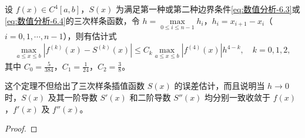 \documentclass[../../main.tex]{subfiles}
\begin{document}
\begin{theorem}\label{theorem:数值分析-定理-5}
设 $f(x)\in C^4[a,b]$，$S(x)$ 为满足第一种或第二种边界条件\eqref{eq:数值分析-6.3}或\eqref{eq:数值分析-6.4}的三次样条函数，令 $h=\max\limits_{0\leqslant i\leqslant n-1} h_i$，$h_i=x_{i+1}-x_i$（$i=0,1,\cdots,n-1$），则有估计式
\begin{align}\label{eq:数值分析-6.17}
\max\limits_{a\leqslant x\leqslant b} | f^{(k)}(x) - S^{(k)}(x) | \leqslant C_k \max\limits_{a\leqslant x\leqslant b} | f^{(4)}(x) | h^{4-k}, \quad k = 0,1,2,
\end{align}
其中 $C_0=\frac{5}{384}$，$C_1=\frac{1}{24}$，$C_2=\frac{3}{8}$。
\end{theorem}
\begin{note}
这个定理不但给出了三次样条插值函数 $S(x)$ 的误差估计，而且说明当 $h\to 0$ 时，$S(x)$ 及其一阶导数 $S'(x)$ 和二阶导数 $S''(x)$ 均分别一致收敛于 $f(x)$，$f'(x)$ 及 $f''(x)$。
\end{note}
\begin{proof}

\end{proof}
\end{document}
